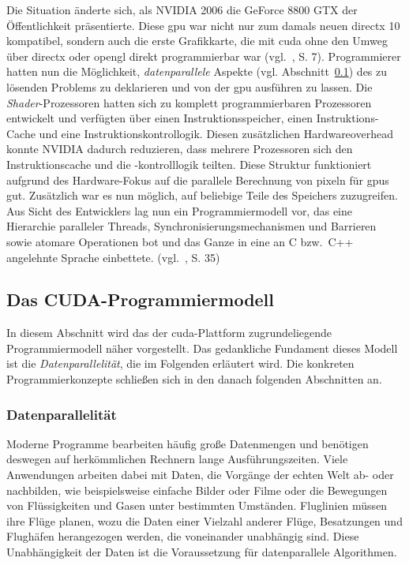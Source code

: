 Die Situation änderte sich, als NVIDIA 2006 die GeForce 8800 GTX der Öffentlichkeit präsentierte. Diese \gls{gpu} war
nicht nur zum damals neuen \gls{directx} 10 kompatibel, sondern auch die erste Grafikkarte, die mit \gls{cuda} ohne den
Umweg über \gls{directx} oder \gls{opengl} direkt programmierbar war (vgl.~\cite{sandkand}, S. 7). Programmierer hatten
nun die Möglichkeit, \textit{datenparallele} Aspekte (vgl. Abschnitt~\ref{cuda:modell}) des zu lösenden Problems zu
deklarieren und von der \gls{gpu} ausführen zu lassen. Die \textit{Shader}-Prozessoren hatten sich zu komplett
programmierbaren Prozessoren entwickelt und verfügten über einen Instruktionsspeicher, einen Instruktions-Cache und eine
Instruktionskontrollogik. Diesen zusätzlichen Hardwareoverhead konnte NVIDIA dadurch reduzieren, dass mehrere
Prozessoren sich den Instruktionscache und die -kontrolllogik teilten. Diese Struktur funktioniert aufgrund des
Hardware-Fokus auf die parallele Berechnung von \gls{pixel}n für \gls{gpu}s gut. Zusätzlich war es nun möglich, auf
beliebige Teile des Speichers zuzugreifen. Aus Sicht des Entwicklers lag nun ein Programmiermodell vor, das eine
Hierarchie paralleler Threads, Synchronisierungsmechanismen und Barrieren sowie atomare Operationen bot und das Ganze in
eine an C bzw.\ C++ angelehnte Sprache einbettete. (vgl.~\cite{kirkhwu}, S. 35)

\subsection{Das CUDA-Programmiermodell}\label{cuda:modell}

In diesem Abschnitt wird das der \gls{cuda}-Plattform zugrundeliegende Programmiermodell näher vorgestellt. Das
gedankliche Fundament dieses Modell ist die \textit{Datenparallelität}, die im Folgenden erläutert wird. Die konkreten
Programmierkonzepte schließen sich in den danach folgenden Abschnitten an.

\subsubsection*{Datenparallelität}

Moderne Programme bearbeiten häufig große Datenmengen und benötigen deswegen auf herkömmlichen Rechnern lange
Ausführungszeiten. Viele Anwendungen arbeiten dabei mit Daten, die Vorgänge der echten Welt ab- oder nachbilden, wie
beispielsweise einfache Bilder oder Filme oder die Bewegungen von Flüssigkeiten und Gasen unter bestimmten Umständen.
Fluglinien müssen ihre Flüge planen, wozu die Daten einer Vielzahl anderer Flüge, Besatzungen und Flughäfen herangezogen
werden, die voneinander unabhängig sind. Diese Unabhängigkeit der Daten ist die Voraussetzung für datenparallele
Algorithmen.

